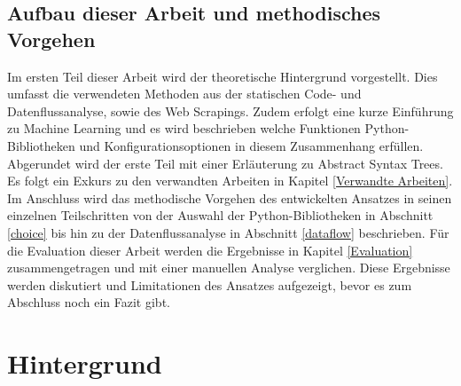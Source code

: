 \documentclass[german,bachelor]{swsLeipzig}
\begin{document}
\section{Aufbau dieser Arbeit und methodisches Vorgehen}
Im ersten Teil dieser Arbeit wird der theoretische Hintergrund vorgestellt.
Dies umfasst die verwendeten Methoden aus der statischen Code- und Datenflussanalyse, sowie des Web Scrapings.
Zudem erfolgt eine kurze Einführung zu Machine Learning und es wird beschrieben welche Funktionen Python-Bibliotheken und
Konfigurationsoptionen in diesem Zusammenhang erfüllen.
Abgerundet wird der erste Teil mit einer Erläuterung zu Abstract Syntax Trees.
Es folgt ein Exkurs zu den verwandten Arbeiten in Kapitel \ref{Verwandte Arbeiten}.
Im Anschluss wird das methodische Vorgehen des entwickelten Ansatzes in seinen einzelnen Teilschritten von der Auswahl
der Python-Bibliotheken in Abschnitt \ref{choice} bis hin zu der Datenflussanalyse in Abschnitt \ref{dataflow} beschrieben.
Für die Evaluation dieser Arbeit werden die Ergebnisse in Kapitel \ref{Evaluation} zusammengetragen und mit einer manuellen Analyse verglichen.
Diese Ergebnisse werden diskutiert und Limitationen des Ansatzes aufgezeigt, bevor es zum Abschluss noch ein Fazit gibt.

\chapter{Hintergrund}\label{Hintergrund}
\end{document}
